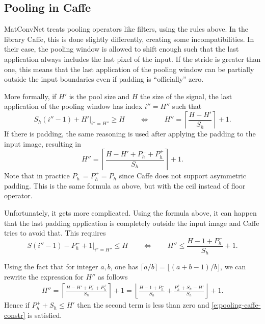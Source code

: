 \subsection{Pooling in Caffe}

MatConvNet treats pooling operators like filters, using the rules above. In the library Caffe, this is done slightly differently, creating some incompatibilities. In their case, the pooling window is allowed to shift enough such that the last application always includes the last pixel of the input. If the stride is greater than one, this means that the last application of the pooling window can be partially outside the input boundaries even if padding is ``officially'' zero.

More formally, if $H'$ is the pool size and $H$ the size of the signal, the last application of the pooling window has index $i'' = H''$ such that
\[
  S_h(i''-1) + H' \big|_{i''= H''} \geq H
  \qquad
  \Leftrightarrow
  \qquad
  H'' = \left\lceil 
  \frac{H - H'}{S_h}
  \right\rceil
  + 1.
\]
If there is padding, the same reasoning is used after applying the padding to the input image, resulting in
\[
H'' = \left\lceil 
  \frac{H - H' + P_h^- + P_h^+}{S_h}
  \right\rceil
  + 1.
\]
Note that in practice $P_h^- = P_h^+ = P_h$ since Caffe does not support asymmetric padding. This is the same formula as above, but with the ceil instead of floor operator.

Unfortunately, it gets more complicated. Using the formula above, it can happen that the last padding application is completely outside the input image and Caffe tries to avoid that. This requires
\begin{equation}\label{e:pooling-caffe-constr}
  S(i'' - 1) - P_h^- + 1 \big|_{i''= H''} \leq H
  \qquad
  \Leftrightarrow
  \qquad
  H'' \leq \frac{H - 1 + P_h^-}{S_h} + 1.	
\end{equation}

Using the fact that for integer $a,b$, one has $\lceil a/b \rceil = \lfloor (a+b-1)/b \rfloor$, we can rewrite the expression for $H''$ as follows
\begin{align*}
H'' = \left\lceil 
  \frac{H - H' + P_h^- + P_h^+}{S_h}
  \right\rceil
  + 1
  =
  \left\lfloor
  \frac{H - 1 +P_h^-}{S_h}
  +
  \frac{P^+_h + S_h - H'}{S_h}
  \right\rfloor
  +1.
 \end{align*}
Hence if $P_h^+ +  S_h \leq H' $ then the second term is less than zero and \eqref{e:pooling-caffe-constr} is satisfied.

